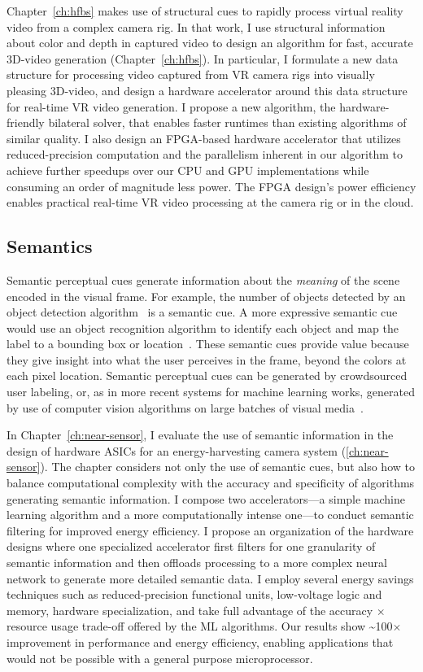 Chapter~\ref{ch:hfbs} makes use of structural cues to rapidly process virtual reality video from a complex camera rig.
In that work, I use structural information about color and depth in captured video to design an algorithm for fast, accurate 3D-\threesixty video generation (Chapter~\ref{ch:hfbs}).
In particular, I formulate a new data structure for processing video captured from VR camera rigs into visually pleasing 3D-\threesixty video, and design a hardware accelerator around this data structure for real-time VR video generation.
I propose a new algorithm, the hardware-friendly bilateral solver, that enables faster runtimes than existing algorithms of similar quality.
I also design an FPGA-based hardware accelerator that utilizes reduced-precision computation and the parallelism inherent in our algorithm to achieve further speedups over our CPU and GPU implementations while consuming an order of magnitude less power.
The FPGA design's power efficiency enables practical real-time VR video processing at the camera rig or in the cloud.

\subsection{Semantics}
Semantic perceptual cues generate information about the \emph{meaning} of the scene encoded in the visual frame.
For example, the number of objects detected by an object detection algorithm~\cite{vj_journal} is a semantic cue.
A more expressive semantic cue would use an object recognition algorithm to identify each object and map the label to a bounding box or location~\cite{redmon2017yolo}.
These semantic cues provide value because they give insight into what the user perceives in the frame, beyond the colors at each pixel location.
Semantic perceptual cues can be generated by crowdsourced user labeling, or, as in more recent systems for machine learning works, generated by use of computer vision algorithms on large batches of visual media~\cite{poms2018scanner}.

In Chapter~\ref{ch:near-sensor}, I evaluate the use of semantic information in the design of hardware ASICs for an energy-harvesting camera system (\ref{ch:near-sensor}).
The chapter considers not only the use of semantic cues, but also how to balance computational complexity with the accuracy and specificity of algorithms generating semantic information.
I compose two accelerators---a simple machine learning algorithm and a more computationally intense one---to conduct semantic filtering for improved energy efficiency.
I propose an organization of the hardware designs where one specialized accelerator first filters for one granularity of semantic information and then offloads processing to a more complex neural network to generate more detailed semantic data.
I employ several energy savings techniques such as reduced-precision functional units, low-voltage logic and memory, hardware specialization, and take full advantage of the accuracy $\times$ resource usage trade-off offered by the ML algorithms.
Our results show \textasciitilde100$\times$ improvement in performance and energy efficiency, enabling applications that would not be possible with a general purpose microprocessor.

